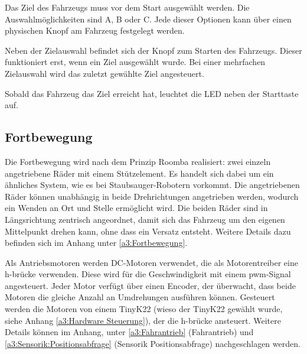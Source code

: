 \documentclass[../main.tex]{subfiles}
\begin{document}
Das Ziel des Fahrzeugs muss vor dem Start ausgewählt werden. Die Auswahlmöglichkeiten sind A, B oder C. Jede dieser Optionen kann über einen physischen Knopf am Fahrzeug festgelegt werden.

Neben der Zielauswahl befindet sich der Knopf zum Starten des Fahrzeugs. Dieser funktioniert erst, wenn ein Ziel ausgewählt wurde. Bei einer mehrfachen Zielauswahl wird das zuletzt gewählte Ziel angesteuert.

Sobald das Fahrzeug das Ziel erreicht hat, leuchtet die LED neben der Starttaste auf.

\subsection{Fortbewegung} 

Die Fortbewegung wird nach dem Prinzip Roomba realisiert: zwei einzeln angetriebene Räder mit einem Stützelement. Es handelt sich dabei um ein ähnliches System, wie es bei Staubsauger-Robotern vorkommt. Die angetriebenen Räder können unabhängig in beide Drehrichtungen angetrieben werden, wodurch ein Wenden an Ort und Stelle ermöglicht wird. Die beiden Räder sind in Längsrichtung zentrisch angeordnet, damit sich das Fahrzeug um den eigenen Mittelpunkt drehen kann, ohne dass ein Versatz entsteht. Weitere Details dazu befinden sich im Anhang unter \ref{a3:Fortbewegung}.

Als Antriebsmotoren werden DC-Motoren verwendet, die als Motorentreiber eine \gls{h-brücke} verwenden. Diese wird für die Geschwindigkeit mit einem \gls{pwm}-Signal angesteuert. Jeder Motor verfügt über einen Encoder, der überwacht, dass beide Motoren die gleiche Anzahl an Umdrehungen ausführen können. Gesteuert werden die Motoren von einem TinyK22 (wieso der TinyK22 gewählt wurde, siehe Anhang \ref{a3:Hardware Steuerung}), der die \gls{h-brücke} ansteuert. Weitere Details können im Anhang, unter \ref{a3:Fahrantrieb} (Fahrantrieb) und \ref{a3:Sensorik:Positionsabfrage} (Sensorik Positionsabfrage) nachgeschlagen werden.
\end{document}
